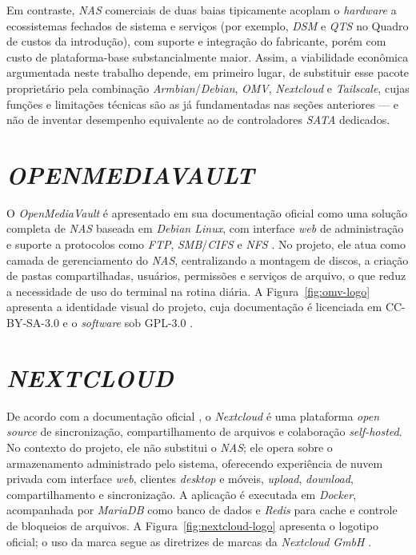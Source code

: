 Em contraste, \textit{NAS} comerciais de duas baias tipicamente acoplam o \textit{hardware} a ecossistemas fechados de sistema e serviços (por exemplo, \textit{DSM} e \textit{QTS} no Quadro de custos da introdução), com suporte e integração do fabricante, porém com custo de plataforma-base substancialmente maior. Assim, a viabilidade econômica argumentada neste trabalho depende, em primeiro lugar, de substituir esse pacote proprietário pela combinação \textit{Armbian}/\textit{Debian}, \textit{OMV}, \textit{Nextcloud} e \textit{Tailscale}, cujas funções e limitações técnicas são as já fundamentadas nas seções anteriores --- e não de inventar desempenho equivalente ao de controladores \textit{SATA} dedicados.

\section{\textit{OPENMEDIAVAULT}}

O \textit{OpenMediaVault} é apresentado em sua documentação oficial como uma solução completa de \textit{NAS} baseada em \textit{Debian Linux}, com interface \textit{web} de administração e suporte a protocolos como \textit{FTP}, \textit{SMB}/\textit{CIFS} e \textit{NFS} \cite{openmediavault2026}. No projeto, ele atua como camada de gerenciamento do \textit{NAS}, centralizando a montagem de discos, a criação de pastas compartilhadas, usuários, permissões e serviços de arquivo, o que reduz a necessidade de uso do terminal na rotina diária. A Figura~\ref{fig:omv-logo} apresenta a identidade visual do projeto, cuja documentação é licenciada em CC-BY-SA-3.0 e o \textit{software} sob GPL-3.0 \cite{omvlicensing2026}.

\begin{figure}[H]
    \centering
\end{figure}

\section{\textit{NEXTCLOUD}}

De acordo com a documentação oficial \cite{nextcloud2026}, o \textit{Nextcloud} é uma plataforma \textit{open source} de sincronização, compartilhamento de arquivos e colaboração \textit{self-hosted}. No contexto do projeto, ele não substitui o \textit{NAS}; ele opera sobre o armazenamento administrado pelo sistema, oferecendo experiência de nuvem privada com interface \textit{web}, clientes \textit{desktop} e móveis, \textit{upload}, \textit{download}, compartilhamento e sincronização. A aplicação é executada em \textit{Docker}, acompanhada por \textit{MariaDB} como banco de dados e \textit{Redis} para cache e controle de bloqueios de arquivos. A Figura~\ref{fig:nextcloud-logo} apresenta o logotipo oficial; o uso da marca segue as diretrizes de marcas da \textit{Nextcloud GmbH} \cite{nextcloudtrademarks2026}.


